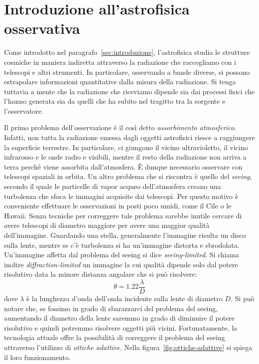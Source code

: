 \section{Introduzione all'astrofisica osservativa}\label{sec:astrofisica-osservativa}
Come introdotto nel paragrafo~\ref{sec:introduzione}, l'astrofisica studia le strutture cosmiche in maniera indiretta attraverso la radiazione che raccogliamo con i telescopi e altri strumenti. In particolare, osservando a bande diverse, si possono estrapolare informazioni quantitative dalla misura della radiazione. Si tenga tuttavia a mente che la radiazione che riceviamo dipende sia dai processi fisici che l'hanno generata sia da quelli che ha subito nel tragitto tra la sorgente e l'osservatore.

Il primo problema dell'osservazione è il così detto \emph{assorbimento atmosferico}. Infatti, non tutta la radiazione emessa dagli oggetti astrofisici riesce a raggiungere la superficie terrestre. In particolare, ci giungono il vicino ultravioletto, il vicino infrarosso e le onde radio e visibili, mentre il resto della radiazione non arriva a terra perché viene assorbita dall'atmosfera. È dunque necessario osservare con telescopi spaziali in orbita. Un altro problema che si riscontra è quello del \emph{seeing}, secondo il quale le particelle di vapor acqueo dell'atmosfera creano una turbolenza che sfoca le immagini acquisite dai telescopi. Per questo motivo è conveniente effettuare le osservazioni in posti poco umidi, come il Cile o le Hawaii. Senza tecniche per correggere tale problema sarebbe inutile cercare di avere telescopi di diametro maggiore per avere una maggior qualità dell'immagine. Guardando una stella, generalmente l'immagine risulta un disco sulla lente, mentre se c'è turbolenza si ha un'immagine distorta e sbrodolata. Un'immagine affetta dal problema del seeing si dice \emph{seeing-limited}. Si chiama inoltre \emph{diffraction-limited} un immagine la cui qualità dipende solo dal potere risolutivo data la minore distanza angolare che si può risolvere:
\[
    \theta = 1.22 \frac{\lambda}{D}
\]
dove $\lambda$ è la lunghezza d'onda dell'onda incidente sulla lente di diametro $D$. Si può notare che, se fossimo in grado di sbarazzarci del problema del seeing, aumentando il diametro della lente saremmo in grado di diminuire il potere risolutivo e quindi potremmo risolvere oggetti più vicini. Fortunatamente, la tecnologia attuale offre la possibilità di correggere il problema del seeing attraverso l'utilizzo di \emph{ottiche adattive}. Nella figura~\ref{fig:ottiche-adattive} si spiega il loro funzionamento. 

